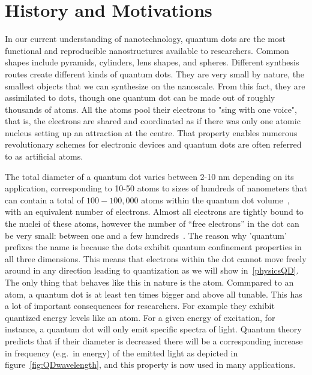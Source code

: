 \chapter{History and Motivations} %
\label{motivations}

In our current understanding of nanotechnology, quantum dots are the most functional and reproducible nanostructures available to researchers. Common shapes include pyramids, cylinders, lens shapes, and spheres.  Different synthesis routes create different kinds of quantum dots. They are very small by nature, the smallest objects that we can synthesize on the nanoscale.  From this fact, they are assimilated to dots, though one quantum dot can be made out of roughly thousands of atoms. All the atoms pool their electrons to "sing with one voice", that is, the electrons are shared and coordinated as if there was only one atomic nucleus setting up an  attraction at the centre. That property enables numerous revolutionary schemes for electronic devices and quantum dots are often referred to as artificial atoms.

The total diameter of a quantum dot varies between 2-10 nm depending on its application, corresponding to 10-50 atoms to sizes of hundreds of nanometers that can contain a total of $100-100,000$ atoms within the quantum dot volume~\cite{shubeurRahman2008}, with an equivalent number of electrons. Almost all electrons are tightly bound to the nuclei of these atoms, however the number of ``free electrons'' in the dot can be very small: between one and a few hundreds~\cite{Kouwenhoven1997}. The reason why 'quantum' prefixes the name is because the dots exhibit quantum confinement properties in all three dimensions. This means that electrons within the dot cannot move freely around in any direction leading to quantization as we will show in~\ref{physicsQD}. The only thing that behaves like this in nature is the atom. Commpared to an atom, a quantum dot is at least ten times bigger and above all tunable. This has a lot of important consequences for researchers.  For example they exhibit quantized energy levels like an atom. For a given energy of excitation, for instance, a quantum dot will only emit specific spectra of light.  Quantum theory predicts that if their diameter is decreased there will be a corresponding increase in frequency (e.g.\ in energy) of the emitted light as depicted in figure~\ref{fig:QDwavelength}, and this property is now used in many applications.

